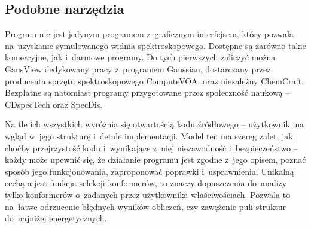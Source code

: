 \subsection{Podobne narzędzia}\label{essence:simmilar}
Program \tesliper{} nie jest jedynym programem z~graficznym interfejsem, który pozwala
  na~uzyskanie symulowanego widma spektroskopowego.
Dostępne są zarówno takie komercyjne, jak i~darmowe programy.
Do tych pierwszych zaliczyć można GausView dedykowany pracy z~programem
  Gaussian, dostarczany przez producenta sprzętu spektroskopowego ComputeVOA,
  oraz niezależny ChemCraft.
Bezpłatne są natomiast programy przygotowane przez społeczność naukową \---
  CDspecTech oraz SpecDis.

Na tle ich wszystkich \tesliper{} wyróżnia się otwartością kodu źródłowego \---
  użytkownik ma wgląd w~jego strukturę i~detale implementacji.
Model ten ma szereg zalet, jak choćby przejrzystość kodu i~wynikające z~niej niezawodność
  i~bezpieczeństwo \--- każdy może upewnić się, że działanie programu jest zgodne z~jego opisem,
  poznać sposób jego funkcjonowania, zaproponować poprawki i~usprawnienia.
Unikalną cechą \tesliper{}a jest funkcja selekcji konformerów, to znaczy dopuszczenia do~analizy
  tylko konformerów o~zadanych przez użytkownika właściwościach.
Pozwala to na~łatwe odrzucenie błędnych wyników obliczeń, czy zawężenie puli struktur do~najniżej
  energetycznych.

